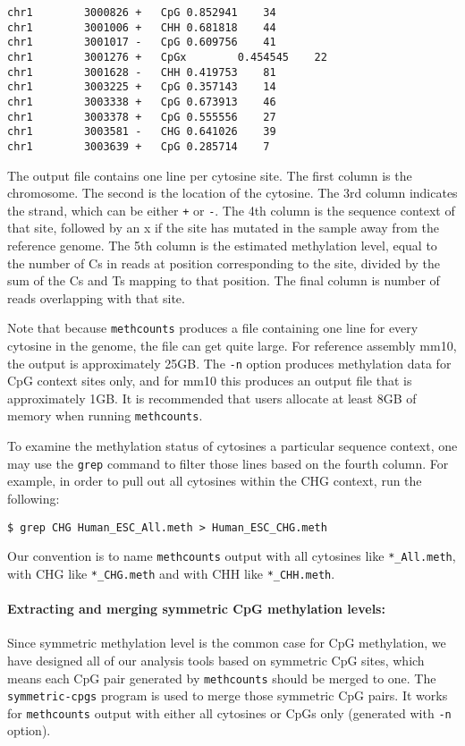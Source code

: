 \documentclass[10pt]{article}
\newcommand{\prog}[1]{\texttt{#1}}
\newcommand{\fn}[1]{\texttt{#1}}
\newcommand{\lit}[1]{\texttt{#1}}
\newcommand{\op}[1]{\texttt{#1}}
\begin{document}
{\small{%
\begin{verbatim}
chr1		3000826	+	CpG	0.852941	34
chr1		3001006	+	CHH	0.681818	44
chr1		3001017	-	CpG	0.609756	41
chr1		3001276	+	CpGx		0.454545	22
chr1		3001628	-	CHH	0.419753	81
chr1		3003225	+	CpG	0.357143	14
chr1		3003338	+	CpG	0.673913	46
chr1		3003378	+	CpG	0.555556	27
chr1		3003581	-	CHG	0.641026	39
chr1		3003639	+	CpG	0.285714	7
\end{verbatim}%
}}

The output file contains one line per cytosine site. The first column is
the chromosome. The second is the location of the cytosine. The 3rd column
indicates the strand, which can be either \lit{+} or \lit{-}. The 4th
column is the sequence context of that site, followed by an x if the
site has mutated in the sample away from the reference genome. The 5th 
column is the estimated methylation level, equal to the number of Cs in 
reads at position corresponding to the site, divided by the sum of the Cs 
and Ts mapping to that position. The final column is number of reads
overlapping with that site.


Note that because \prog{methcounts} produces a file containing one line
for every cytosine in the genome, the file can get quite large. For
reference assembly mm10, the output is approximately 25GB. The \op{-n}
option produces methylation data for CpG context sites only, and for
mm10 this produces an output file that is approximately 1GB. It is
recommended that users allocate at least 8GB of memory when running
\prog{methcounts}.

To examine the methylation status of cytosines a particular sequence
context, one may use the \prog{grep} command to filter those lines
based on the fourth column. For example, in order to pull out all
cytosines within the CHG context, run the following:

\begin{verbatim}
$ grep CHG Human_ESC_All.meth > Human_ESC_CHG.meth
\end{verbatim}

Our convention is to name \prog{methcounts} output with all cytosines
like \fn{*\_All.meth}, with CHG like \fn{*\_CHG.meth} and
with CHH like \fn{*\_CHH.meth}.

\paragraph{Extracting and merging symmetric CpG methylation levels:}
\label{sec:symmetric-cpg}
Since symmetric methylation level is the common case for CpG methylation,
we have designed all of our analysis tools based on symmetric CpG sites, 
which means each CpG pair generated by \prog{methcounts} should be
merged to one. The \prog{symmetric-cpgs} program is used to merge those
symmetric CpG pairs. It works for \prog{methcounts} output with either
all cytosines or CpGs only (generated with \texttt{-n} option).
\end{document}

